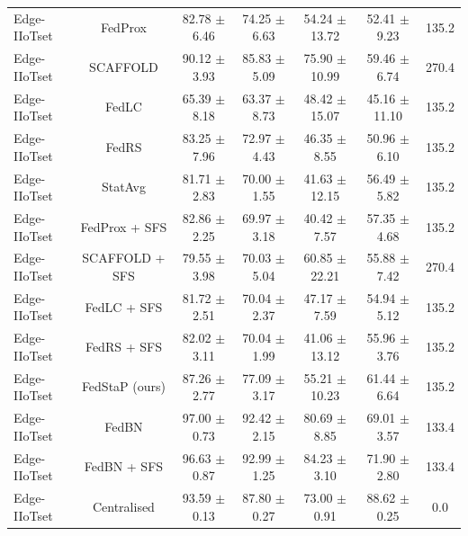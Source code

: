 \begin{table}[t]
\begin{tabular}{lcccccc}
Edge-IIoTset & FedProx & 82.78 $\pm$ 6.46 & 74.25 $\pm$ 6.63 & 54.24 $\pm$ 13.72 & 52.41 $\pm$ 9.23 & 135.2 \\
Edge-IIoTset & SCAFFOLD & 90.12 $\pm$ 3.93 & 85.83 $\pm$ 5.09 & 75.90 $\pm$ 10.99 & 59.46 $\pm$ 6.74 & 270.4 \\
Edge-IIoTset & FedLC & 65.39 $\pm$ 8.18 & 63.37 $\pm$ 8.73 & 48.42 $\pm$ 15.07 & 45.16 $\pm$ 11.10 & 135.2 \\
Edge-IIoTset & FedRS & 83.25 $\pm$ 7.96 & 72.97 $\pm$ 4.43 & 46.35 $\pm$ 8.55 & 50.96 $\pm$ 6.10 & 135.2 \\
Edge-IIoTset & StatAvg & 81.71 $\pm$ 2.83 & 70.00 $\pm$ 1.55 & 41.63 $\pm$ 12.15 & 56.49 $\pm$ 5.82 & 135.2 \\
Edge-IIoTset & FedProx + SFS & 82.86 $\pm$ 2.25 & 69.97 $\pm$ 3.18 & 40.42 $\pm$ 7.57 & 57.35 $\pm$ 4.68 & 135.2 \\
Edge-IIoTset & SCAFFOLD + SFS & 79.55 $\pm$ 3.98 & 70.03 $\pm$ 5.04 & 60.85 $\pm$ 22.21 & 55.88 $\pm$ 7.42 & 270.4 \\
Edge-IIoTset & FedLC + SFS & 81.72 $\pm$ 2.51 & 70.04 $\pm$ 2.37 & 47.17 $\pm$ 7.59 & 54.94 $\pm$ 5.12 & 135.2 \\
Edge-IIoTset & FedRS + SFS & 82.02 $\pm$ 3.11 & 70.04 $\pm$ 1.99 & 41.06 $\pm$ 13.12 & 55.96 $\pm$ 3.76 & 135.2 \\
Edge-IIoTset & FedStaP (ours) & 87.26 $\pm$ 2.77 & 77.09 $\pm$ 3.17 & 55.21 $\pm$ 10.23 & 61.44 $\pm$ 6.64 & 135.2 \\
Edge-IIoTset & FedBN & 97.00 $\pm$ 0.73 & 92.42 $\pm$ 2.15 & 80.69 $\pm$ 8.85 & 69.01 $\pm$ 3.57 & 133.4 \\
Edge-IIoTset & FedBN + SFS & 96.63 $\pm$ 0.87 & 92.99 $\pm$ 1.25 & 84.23 $\pm$ 3.10 & 71.90 $\pm$ 2.80 & 133.4 \\
Edge-IIoTset & Centralised & 93.59 $\pm$ 0.13 & 87.80 $\pm$ 0.27 & 73.00 $\pm$ 0.91 & 88.62 $\pm$ 0.25 & 0.0 \\
\bottomrule
\end{tabular}
\end{table}

